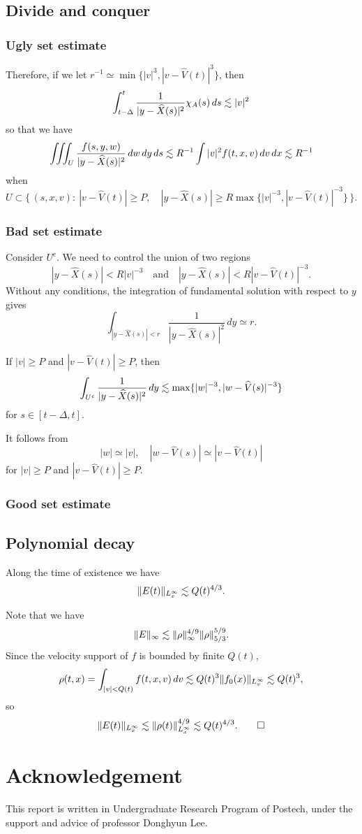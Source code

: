 \documentclass[11pt]{amsart}
\begin{document}
\subsection{Divide and conquer}
\subsubsection{Ugly set estimate}

Therefore, if we let $r^{-1}\simeq\min\{|v|^3,|v-\hat V(t)|^3\}$, then
\[\int_{t-\Delta}^t\frac1{|y-\widehat X(s)|^2}\chi_A(s)\,ds\lesssim|v|^2\]
so that we have
\[\iiint_U\frac{f(s,y,w)}{|y-\widehat X(s)|^2}\,dw\,dy\,ds\lesssim R^{-1}\int|v|^2f(t,x,v)\,dv\,dx\lesssim R^{-1}\]
when
\[U\subset\{\,(s,x,v):\ |v-\hat V(t)|\ge P,\quad|y-\hat X(s)|\ge R\max\{|v|^{-3},|v-\hat V(t)|^{-3}\}\,\}.\]

\subsubsection{Bad set estimate}
Consider $U^c$.
We need to control the union of two regions
\[|y-\hat X(s)|<R|v|^{-3}\quad\text{and}\quad|y-\hat X(s)|<R|v-\hat V(t)|^{-3}.\]
Without any conditions, the integration of fundamental solution with respect to $y$ gives
\[\int_{|y-\hat X(s)|<r}\frac1{|y-\hat X(s)|^2}\,dy\simeq r.\]
\begin{clm}
If $|v|\ge P$ and $|v-\hat V(t)|\ge P$, then
\[\int_{U^c}\frac1{|y-\widehat X(s)|^2}\,dy\lesssim\max\{|w|^{-3},|w-\widehat V(s)|^{-3}\}\]
for $s\in[t-\Delta,t]$.
\end{clm}
\begin{pf}
It follows from
\[|w|\simeq|v|,\quad|w-\hat V(s)|\simeq|v-\hat V(t)|\]
for $|v|\ge P$ and $|v-\hat V(t)|\ge P$.
\end{pf}

\subsubsection{Good set estimate}

\subsection{Polynomial decay}
\begin{lem}
Along the time of existence we have
\[\|E(t)\|_{L_x^\infty}\lesssim Q(t)^{4/3}.\]
\end{lem}
\begin{pf}
Note that we have
\[\|E\|_\infty\lesssim\|\rho\|_\infty^{4/9}\|\rho\|_{5/3}^{5/9}.\]
Since the velocity support of $f$ is bounded by finite $Q(t)$,
\[\rho(t,x)=\int_{|v|<Q(t)}f(t,x,v)\,dv\lesssim Q(t)^3\|f_0(x)\|_{L_v^\infty}\lesssim Q(t)^3,\]
so
\[\|E(t)\|_{L_x^\infty}\lesssim\|\rho(t)\|_{L_x^\infty}^{4/9}\lesssim Q(t)^{4/3}.\qedhere\]
\end{pf}


\section*{Acknowledgement}
This report is written in Undergraduate Research Program of Postech, under the support and advice of professor Donghyun Lee.
\end{document}

